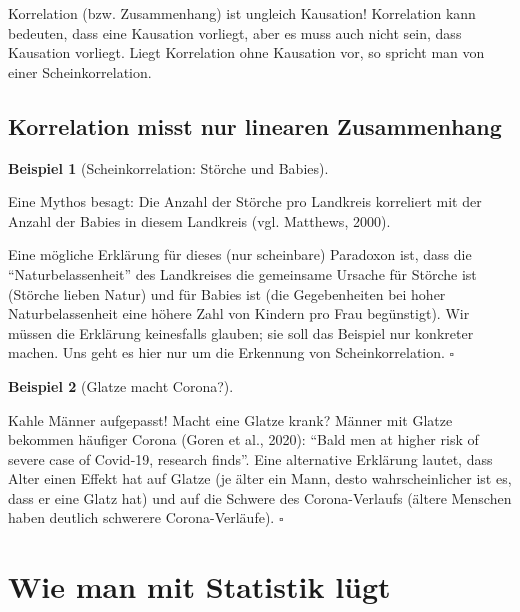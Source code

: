 \documentclass[
  letterpaper,
  oneside,
  open=any]{scrbook}
\theoremstyle{definition}
\theoremstyle{definition}
\newtheorem{example}{Beispiel}[chapter]
\theoremstyle{definition}
\theoremstyle{remark}
\begin{document}
Korrelation (bzw. Zusammenhang) ist ungleich Kausation! Korrelation kann
bedeuten, dass eine Kausation vorliegt, aber es muss auch nicht sein,
dass Kausation vorliegt. Liegt Korrelation ohne Kausation vor, so
spricht man von einer Scheinkorrelation.

\subsection{Korrelation misst nur linearen
Zusammenhang}\label{korrelation-misst-nur-linearen-zusammenhang}

\begin{example}[Scheinkorrelation: Störche und
Babies]\protect\hypertarget{exm-scheinkorr}{}\label{exm-scheinkorr}

Eine Mythos besagt: Die Anzahl der Störche pro Landkreis korreliert mit
der Anzahl der Babies in diesem Landkreis (vgl. Matthews, 2000).

Eine mögliche Erklärung für dieses (nur scheinbare) Paradoxon ist, dass
die \enquote{Naturbelassenheit} des Landkreises die gemeinsame Ursache
für Störche ist (Störche lieben Natur) und für Babies ist (die
Gegebenheiten bei hoher Naturbelassenheit eine höhere Zahl von Kindern
pro Frau begünstigt). Wir müssen die Erklärung keinesfalls glauben; sie
soll das Beispiel nur konkreter machen. Uns geht es hier nur um die
Erkennung von Scheinkorrelation. \(\square\)

\end{example}

\begin{example}[Glatze macht
Corona?]\protect\hypertarget{exm-corona-glatze}{}\label{exm-corona-glatze}

Kahle Männer aufgepasst! Macht eine Glatze krank? Männer mit Glatze
bekommen häufiger Corona (Goren et al., 2020): \enquote{Bald men at
higher risk of severe case of Covid-19, research finds}. Eine
alternative Erklärung lautet, dass Alter einen Effekt hat auf Glatze (je
älter ein Mann, desto wahrscheinlicher ist es, dass er eine Glatz hat)
und auf die Schwere des Corona-Verlaufs (ältere Menschen haben deutlich
schwerere Corona-Verläufe). \(\square\)

\end{example}

\section{Wie man mit Statistik
lügt}\label{wie-man-mit-statistik-luxfcgt-3}
\end{document}
